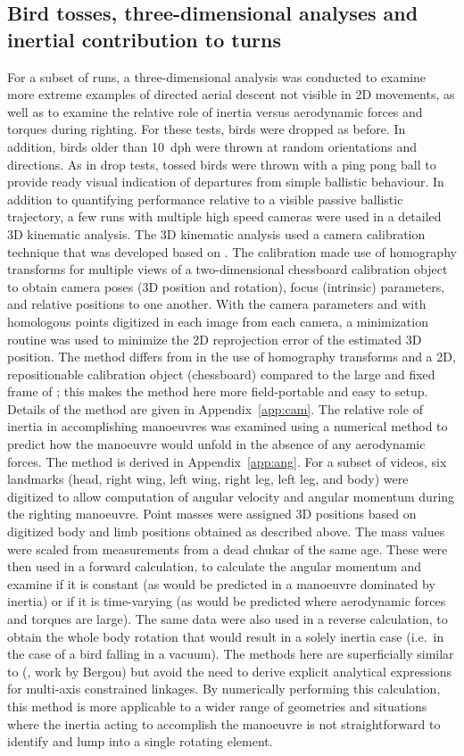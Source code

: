 \documentclass[10pt]{article}
\begin{document}
\subsection{Bird tosses, three-dimensional analyses and inertial contribution to turns}
	For a subset of runs, a three-dimensional analysis was conducted to examine more extreme examples of directed aerial descent not visible in 2D movements, as well as to examine the relative role of inertia versus aerodynamic forces and torques during righting. For these tests, birds were dropped as before.  In addition, birds older than \SI{10}{dph} were thrown at random orientations and directions.  As in drop tests, tossed birds were thrown with a ping pong ball to provide ready visual indication of departures from simple ballistic behaviour. 
	In addition to quantifying performance relative to a visible passive ballistic trajectory, a few runs with multiple high speed cameras were used in a detailed 3D kinematic analysis.  The 3D kinematic analysis used a camera calibration technique that was developed based on \citep{Munk:2011, Bradski:2008}. The calibration made use of homography transforms for multiple views of a two-dimensional chessboard calibration object to obtain camera poses (3D position and rotation), focus (intrinsic) parameters, and relative positions to one another.  With the camera parameters and with homologous points digitized in each image from each camera, a minimization routine was used to minimize the 2D reprojection error of the estimated 3D position. The method differs from \citep{Munk:2011} in the use of homography transforms and a 2D, repositionable calibration object (chessboard) compared to the large and fixed frame of \citep{Munk:2011}; this makes the method here more field-portable and easy to setup.  Details of the method are given in Appendix~\ref{app:cam}.  
	The relative role of inertia in accomplishing manoeuvres was examined using a numerical method to predict how the manoeuvre would unfold in the absence of any aerodynamic forces.  The method is derived in Appendix~\ref{app:ang}.  For a subset of videos, six landmarks (head, right wing, left wing, right leg, left leg, and body) were digitized to allow computation of angular velocity and angular momentum during the righting manoeuvre.
	Point masses were assigned 3D positions based on digitized body and limb positions obtained as described above.  The mass values were scaled from measurements from a dead chukar of the same age.  These were then used in a forward calculation, to calculate the angular momentum and examine if it is constant (as would be predicted in a manoeuvre dominated by inertia) or if it is time-varying (as would be predicted where aerodynamic forces and torques are large).  The same data were also used in a reverse calculation, to obtain the whole body rotation that would result in a solely inertia case (i.e.\ in the case of a bird falling in a vacuum).  The methods here are superficially similar to (\citealp{Jusufi:2008}, work by Bergou) but avoid the need to derive explicit analytical expressions for multi-axis constrained linkages.  By numerically performing this calculation, this method is more applicable to a wider range of geometries and situations where the inertia acting to accomplish the manoeuvre is not straightforward to identify and lump into a single rotating element. 
\end{document}
